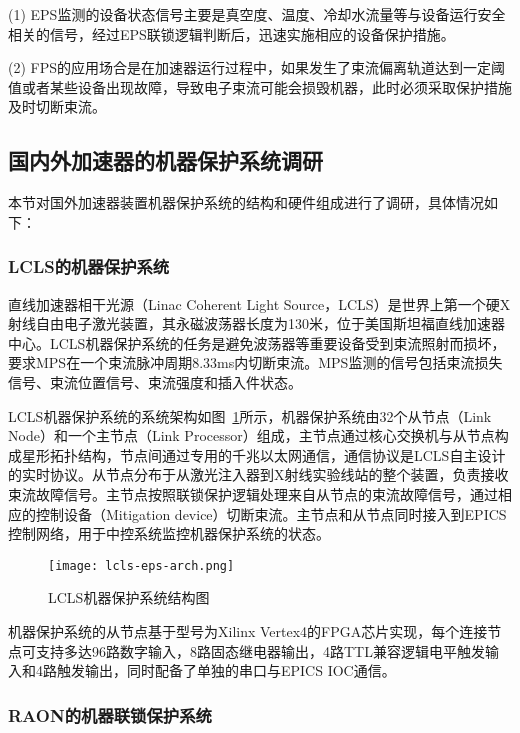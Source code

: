 (1) EPS监测的设备状态信号主要是真空度、温度、冷却水流量等与设备运行安全相关的信号，经过EPS联锁逻辑判断后，迅速实施相应的设备保护措施。

(2) FPS的应用场合是在加速器运行过程中，如果发生了束流偏离轨道达到一定阈值或者某些设备出现故障，导致电子束流可能会损毁机器，此时必须采取保护措施及时切断束流。

\subsection{国内外加速器的机器保护系统调研}
本节对国外加速器装置机器保护系统的结构和硬件组成进行了调研，具体情况如下：

\subsubsection{LCLS的机器保护系统}

直线加速器相干光源（Linac Coherent Light Source，LCLS）是世界上第一个硬X射线自由电子激光装置，其永磁波荡器长度为130米，位于美国斯坦福直线加速器中心。LCLS机器保护系统的任务是避免波荡器等重要设备受到束流照射而损坏，要求MPS在一个束流脉冲周期8.33ms内切断束流。MPS监测的信号包括束流损失信号、束流位置信号、束流强度和插入件状态。

LCLS机器保护系统的系统架构如图~\ref{fig:lcls-eps-arch}所示，机器保护系统由32个从节点（Link Node）和一个主节点（Link Processor）组成，主节点通过核心交换机与从节点构成星形拓扑结构，节点间通过专用的千兆以太网通信，通信协议是LCLS自主设计的实时协议。从节点分布于从激光注入器到X射线实验线站的整个装置，负责接收束流故障信号。主节点按照联锁保护逻辑处理来自从节点的束流故障信号，通过相应的控制设备（Mitigation device）切断束流。主节点和从节点同时接入到EPICS控制网络，用于中控系统监控机器保护系统的状态\cite{Norum-2009}。

\begin{figure}[!htb]
	\centering
	\texttt{[image: lcls-eps-arch.png]}
	\caption{LCLS机器保护系统结构图}
	\label{fig:lcls-eps-arch}
\end{figure}

机器保护系统的从节点基于型号为Xilinx Vertex4的FPGA芯片实现，每个连接节点可支持多达96路数字输入，8路固态继电器输出，4路TTL兼容逻辑电平触发输入和4路触发输出，同时配备了单独的串口与EPICS IOC通信。

\subsubsection{RAON的机器联锁保护系统}

